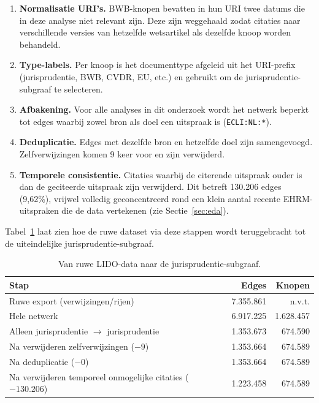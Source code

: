 \documentclass[a4paper, 12pt]{report}
\begin{document}
\begin{enumerate}
  \item \textbf{Normalisatie URI's.} BWB-knopen bevatten in hun URI twee datums die in deze analyse niet relevant zijn. Deze zijn weggehaald zodat citaties naar verschillende versies van hetzelfde wetsartikel als dezelfde knoop worden behandeld.
  \item \textbf{Type-labels.} Per knoop is het documenttype afgeleid uit het URI-prefix (jurisprudentie, BWB, CVDR, EU, etc.) en gebruikt om de jurisprudentie-subgraaf te selecteren.
  \item \textbf{Afbakening.} Voor alle analyses in dit onderzoek wordt het netwerk beperkt tot edges waarbij zowel bron als doel een uitspraak is (\texttt{ECLI:NL:*}).
  \item \textbf{Deduplicatie.} Edges met dezelfde bron en hetzelfde doel zijn samengevoegd. Zelfverwijzingen komen 9 keer voor en zijn verwijderd.
  \item \textbf{Temporele consistentie.} Citaties waarbij de citerende uitspraak ouder is dan de geciteerde uitspraak zijn verwijderd. Dit betreft 130.206 edges (9,62\%), vrijwel volledig geconcentreerd rond een klein aantal recente EHRM-uitspraken die de data vertekenen (zie Sectie~\ref{sec:eda}).
\end{enumerate}

Tabel~\ref{tab:funnel} laat zien hoe de ruwe dataset via deze stappen wordt teruggebracht tot de uiteindelijke jurisprudentie-subgraaf.

\begin{table}[ht]
  \centering
  \caption{Van ruwe LIDO-data naar de jurisprudentie-subgraaf.}
  \label{tab:funnel}
  \begin{tabular}{lrr}
    \toprule
    Stap & Edges & Knopen \\
    \midrule
    Ruwe export (verwijzingen/rijen)                   & 7.355.861 & n.v.t. \\
    Hele netwerk                                       & 6.917.225 & 1.628.457 \\
    Alleen jurisprudentie $\rightarrow$ jurisprudentie & 1.353.673 & 674.590 \\
    Na verwijderen zelfverwijzingen ($-9$)             & 1.353.664 & 674.589 \\
    Na deduplicatie ($-0$)                             & 1.353.664 & 674.589 \\
    Na verwijderen temporeel onmogelijke citaties ($-130.206$) & 1.223.458 & 674.589 \\
    \bottomrule
  \end{tabular}
\end{table}
\end{document}
